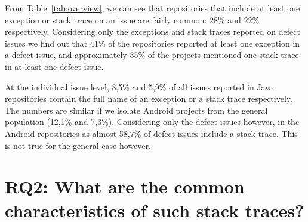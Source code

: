 \documentclass[conference]{IEEEtran}
\begin{document}
%
From Table~\ref{tab:overview}, we can see that repositories that include at
least one exception or stack trace on an issue are fairly common: 28\% and 22\%
respectively. Considering only the exceptions and stack traces reported on
defect issues we find out that 41\% of the repositories reported at least one
exception in a defect issue, and approximately 35\% of the projects mentioned
one stack trace in at least one defect issue.

At the individual issue level, 8,5\% and 5,9\% of all issues reported in Java
repositories contain the full name of an exception or a stack trace
respectively. The numbers are similar if we isolate Android projects from the
general population (12,1\% and 7,3\%). Considering only the defect-issues
however, in the Android repositories as almost 58,7\% of defect-issues include a
stack trace. This is not true for the general case however.



\section{RQ2: What are the common characteristics of such stack traces?}
\end{document}

